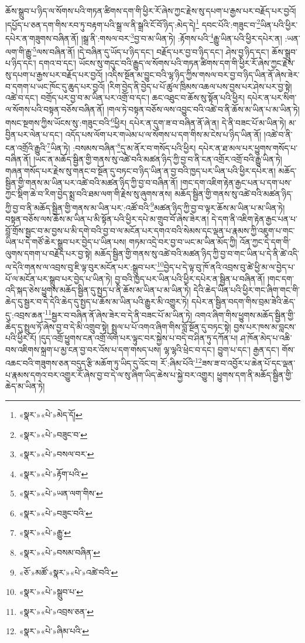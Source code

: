 ཆོས་སྒྲུབ་པ་ཉིད་ལ་སོགས་པའི་གཏན་ཚིགས་དག་གི་ཕྱིར་རོ་ཞེས་ཀྱང་རྗེས་སུ་དཔག་པ་རྒྱས་པར་བརྗོད་པར་བྱའོ། །དཔྱོད་པ་ཅན་དག་གིས་རབ་ཏུ་བརྟག་པའི་སྒྲ་ལ་ནི་སྒྲའི་ངོ་བོ་ཉིད་:མེད་དེ།\footnote{«སྣར་»«པེ་»མེད་དོ།} དབང་པོའི་:གཟུང་བ་\footnote{«སྣར་»«པེ་»བཟུང་བ་}ཡིན་པའི་ཕྱིར་དཔེར་ན་གཟུགས་བཞིན་ནོ། །སྒྲ་ནི་:གསལ་བར་\footnote{«སྣར་»«པེ་»བསལ་བར་}བྱ་བ་མ་ཡིན་ཏེ། :རྟོགས་པའི་\footnote{«སྣར་»«པེ་»རྟོག་པའི་}རྒྱུ་ཡིན་པའི་ཕྱིར་དཔེར་ན། :ཡན་ལག་གི་རྒྱུ་\footnote{«སྣར་»«པེ་»ཡན་ལག་གིས་}ལས་བཞིན་ནོ། །དེ་བཞིན་དུ་ཡོད་པ་ཉིད་དང་། བརྗོད་པར་བྱ་བ་ཉིད་དང་། ཤེས་བྱ་ཉིད་དང་། ཆོས་སྒྲུབ་པ་ཉིད་དང་། དགའ་བ་དང་། ཡོངས་སུ་གདུང་བའི་རྒྱུད་ལ་སོགས་པའི་གཏན་ཚིགས་དག་གི་ཕྱིར་རོ་ཞེས་ཀྱང་རྗེས་སུ་དཔག་པ་རྒྱས་པར་བརྗོད་པར་བྱའོ། །འདིས་སྔོན་མ་བྱུང་བའི་ལྷ་ཉིད་ཀྱིས་གསལ་བར་བྱ་བ་ཉིད་ཡིན་ནོ་ཞེས་ཟེར་བ་དགག་པ་ཡང་ཁོང་དུ་ཆུད་པར་བྱའོ། །རིག་བྱེད་ནི་བྱེད་པ་པོ་ཚུལ་ཁྲིམས་འཆལ་པས་བྱས་པར་ཤེས་པར་བྱ་སྟེ། འཚེ་བ་དང་། བགྲོད་པར་བྱ་བ་མ་ཡིན་པར་འགྲོ་བ་དང་། ཆང་འཐུང་བ་ཆོས་སུ་སྟོན་པའི་ཕྱིར། དཔེར་ན་པར་སིག་ལ་སོགས་པའི་བསྟན་བཅོས་བཞིན་ནོ། །གལ་ཏེ་བསྟན་བཅོས་ལས་འབྱུང་བའི་འཚེ་བ་ནི་ཆོས་མ་ཡིན་པ་མ་ཡིན་ཏེ། གསང་སྔགས་ཀྱིས་ཡོངས་སུ་:གཟུང་བའི་\footnote{«སྣར་»«པེ་»བཟུང་བའི་}ཕྱིར། དཔེར་ན་དུག་ཟ་བ་བཞིན་ནོ་ཞེ་ན། དེ་ནི་བཟང་པོ་མ་ཡིན་ཏེ། མ་བྱིན་པར་ལེན་པ་དང་། འདོད་པས་ལོག་པར་གཡེམ་པ་ལ་སོགས་པ་དག་གིས་མ་ངེས་པ་ཉིད་ཡིན་ནོ། །འཚེ་བ་ནི་ངན་འགྲོའི་རྒྱུའི་\footnote{«སྣར་»«པེ་»རྒྱུ་}ཡིན་ཏེ། :བསམས་བཞིན་\footnote{«སྣར་»«པེ་»བསམ་བཞིན་}དུ་མ་ནོར་བ་གསོད་པའི་ཕྱིར། དཔེར་ན་ཐ་མལ་པར་ཕྱུགས་གསོད་པ་བཞིན་ནོ། །ཡང་ན་མཆོད་སྦྱིན་གྱི་གནས་སུ་འཚེ་བའི་མཚན་ཉིད་ཀྱི་བྱ་བ་ནི་ངན་འགྲོར་འགྲོ་བའི་རྒྱུ་ཡིན་ཏེ། གཞན་གསོད་པར་རྗེས་སུ་གནང་བ་སྔོན་དུ་བཏང་བ་ཉིད་ཡིན་ན་བྱ་བའི་ཁྱད་པར་ཡིན་པའི་ཕྱིར་དཔེར་ན། མཆོད་སྦྱིན་གྱི་གནས་མ་ཡིན་པར་འཚེ་བའི་མཚན་ཉིད་ཀྱི་བྱ་བ་བཞིན་ནོ། །གང་དག་འཇིག་རྟེན་རྒྱང་པན་པ་དག་པས་ཀྱང་སྡིག་ཆེ་བ་རིག་བྱེད་སྨྲ་བའི་ཐམ་ལག་གི་རྗེས་སུ་ཞུགས་ནས། མཆོད་སྦྱིན་གྱི་གནས་སུ་འཚེ་བའི་མཚན་ཉིད་ཀྱི་བྱ་བ་ནི་མཆོད་སྦྱིན་གྱི་གནས་མ་ཡིན་པར་:འཚོ་བའི་\footnote{«ཅོ་»མཚོ་«སྣར་»«པེ་»འཚེ་བའི་}མཚན་ཉིད་ཀྱི་བྱ་བ་ལྟར་ཆོས་མ་ཡིན་པ་མ་ཡིན་ཏེ། བསྟན་བཅོས་ལས་ཆོས་མ་ཡིན་པ་མི་སྟོན་པའི་ཕྱིར་དཔེ་མ་གྲུབ་བོ་ཞེས་ཟེར་ན། དེ་དག་ནི་འཇིག་རྟེན་རྒྱང་པན་པ་བློ་གྲོས་སྦྱང་བ་མ་བྱས་པ་མི་དགེ་བའི་བྱ་བ་ལ་མངོན་པར་དགའ་བའི་སེམས་དང་ལྡན་པ་རྣམས་ཀྱི་འཇུག་པ་གང་ཡིན་པ་དེ་གཙོ་ཆེར་སྒྲུབ་པར་བྱེད་པ་ཡིན་པས། གཏམ་འདྲེ་བར་བྱ་བ་ཡང་མ་ཡིན་མོད་ཀྱི། འོན་ཀྱང་དེ་དག་གི་ལུགས་དགག་པ་བརྗོད་པར་བྱ་སྟེ། མཆོད་སྦྱིན་གྱི་གནས་སུ་འཚེ་བའི་མཚན་ཉིད་ཀྱི་བྱ་བ་གང་ཡིན་པ་དེ་ནི་ཚེ་འདི་ལ་དེའི་གནས་ལ་འབྲས་བུ་ཇི་ལྟ་བུར་མངོན་པར་:སྒྲུབ་པར་\footnote{«སྣར་»«པེ་»སྒྲུབ་པ་}བྱེད་པ་དེ་ལྟ་བུ་ཁོ་ནའི་འབྲས་བུ་ཚེ་ཕྱི་མ་ལ་བྱེད་པ་པོ་ལ་མངོན་པར་སྒྲུབ་པར་བྱེད་པ་ཡིན་ཏེ། བྱ་བའི་ཁྱད་པར་ཡིན་པའི་ཕྱིར་དཔེར་ན་སྦྱིན་པ་བཞིན་ནོ། །གང་དག་འདི་སྐད་ཅེས་ཕྱུགས་མཆོད་སྦྱིན་དུ་སྤྱད་པ་ནི་ཆོས་མ་ཡིན་པ་མ་ཡིན་ཏེ། དེའི་ཆེད་ཡིན་པའི་ཕྱིར་གང་ཞིག་གང་གི་ཆེད་དུ་སྦྱར་བ་དེ་དེའི་ཆེད་དུ་སྤྱད་པ་ཆོས་མ་ཡིན་པའི་རྒྱུར་མི་འགྱུར་ཏེ། དཔེར་ན་སྦྱིན་བདག་གིས་བྲམ་ཟེའི་ཆེད་དུ་:འབྲས་ཆན་\footnote{«སྣར་»«པེ་»འབྲས་ཅན་}སྦྱར་བ་བཞིན་ནོ་ཞེས་ཟེར་བ་དེ་ནི་བཟང་པོ་མ་ཡིན་ཏེ། འགའ་ཞིག་གིས་ཕྱུགས་མཆོད་སྦྱིན་གྱི་ཆེད་དུ་སྤྲུལ་ཏོ་ཞེས་བྱ་བ་དེ་མི་འགྲུབ་སྟེ། སྤྲུལ་པ་པོ་འགའ་ཞིག་གིས་བློ་སྔོན་དུ་བཏང་སྟེ། བྱས་པར་ཁས་མ་བླངས་པའི་ཕྱིར་རོ། །དུད་འགྲོ་ཕྱུགས་ངན་འགྲོ་ལོག་པར་ལྟུང་བར་སྐྱེས་པ་བདེ་བ་ཤིན་ཏུ་དཀོན་པ། ཤ་ཁོན་མེད་པ་འཆི་བས་འཇིགས་སྐྲག་པ་མྱ་ངན་བྱ་བར་འོས་པ་དག་གསད་པས། ལྷ་ལྷའི་ཕྲེང་བ་དང་། བྱུག་པ་དང་། རྒྱན་དང་། གོས་འཆང་བའི་གཟུགས་ཅན་བདུད་རྩི་མཆོག་ཏུ་ཡིད་དུ་འོང་བ། རོ་:ཞིམ་པོའི་\footnote{«སྣར་»«པེ་»ཞིམ་པའི་}ཟས་ཟ་བ་འབྱོར་པ་ཆེན་པོ་དང་ལྡན་པ་རྣམས་དགའ་བར་འགྱུར་རོ་ཞེས་བྱ་བ་དེ་ལ་སུ་ཞིག་ཡིད་ཆེས་པ་སྐྱེ་བར་འགྱུར། ཕྱུགས་དག་ནི་མཆོད་སྦྱིན་གྱི་ཆེད་མ་ཡིན་ཏེ། 